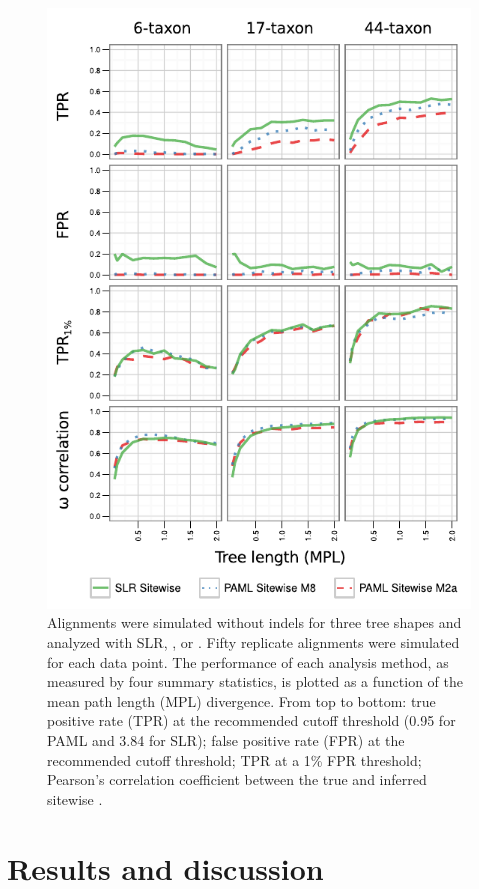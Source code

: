 \begin{figure}[t!]
\centering
\includegraphics[scale=1]{Figs/fig2.pdf}
\caption{Alignments were simulated without indels for three tree
  shapes and analyzed with SLR, \meight, or \mtwo. Fifty replicate
  alignments were simulated for each data point. The performance of
  each analysis method, as measured by four summary statistics, is
  plotted as a function of the mean path length (MPL) divergence. From
  top to bottom: true positive rate (TPR) at the recommended cutoff
  threshold (0.95 for PAML and 3.84 for SLR); false positive rate
  (FPR) at the recommended cutoff threshold; TPR at a 1\% FPR
  threshold; Pearson's correlation coefficient between the true and
  inferred sitewise \omg.}
\label{fig_2}
\end{figure}

\section{Results and discussion}
